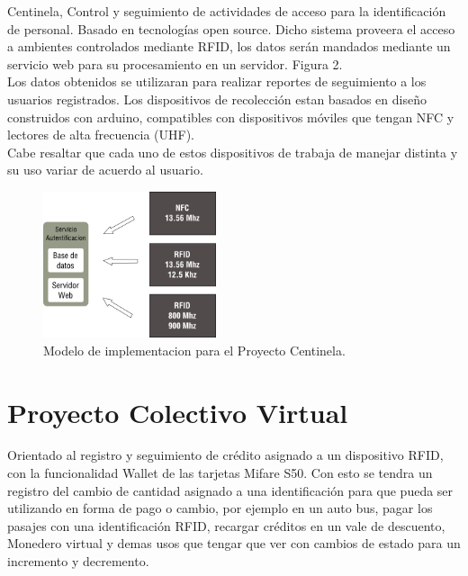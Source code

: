 \documentclass[11pt,twocolumn]{article}
\begin{document}
Centinela, Control y seguimiento de actividades de acceso para la identificaci\'on de personal. Basado en tecnolog\'ias  open source. Dicho sistema  proveera el acceso a ambientes controlados mediante RFID, los datos ser\'an mandados mediante un servicio web para su procesamiento en un servidor. Figura 2.\\

Los datos obtenidos se utilizaran para realizar reportes de seguimiento a los usuarios registrados. Los dispositivos de recolecci\'on estan basados en dise\~no construidos con arduino, compatibles con dispositivos m\'oviles que tengan NFC y lectores de alta frecuencia (UHF).\\

Cabe resaltar que cada uno de estos dispositivos de trabaja de manejar distinta y su uso variar de acuerdo al usuario.\\

\begin{figure}[!h]
  \begin{center}
    \includegraphics[width=2in]{architect.png}
  \end{center}

  \caption{\small Modelo de implementacion para el Proyecto Centinela.}
  \label{fig-label}
\end{figure}

\section{Proyecto Colectivo Virtual}

Orientado al registro y seguimiento de cr\'edito asignado a un dispositivo RFID, con la funcionalidad Wallet de las tarjetas Mifare S50. Con esto se tendra un registro del cambio de cantidad asignado a una identificaci\'on para que pueda ser utilizando en forma de pago o cambio, por ejemplo en un auto bus, pagar los pasajes con una identificaci\'on RFID, recargar cr\'editos en un vale de descuento, Monedero virtual y demas usos que tengar que ver con cambios de estado para un incremento y decremento.\\
\end{document}

